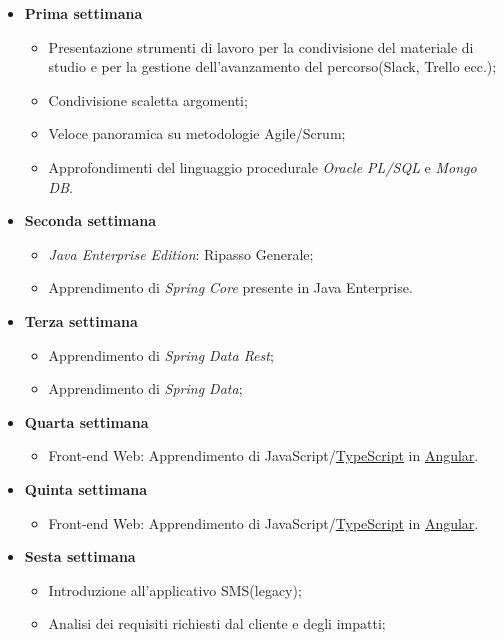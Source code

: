 \begin{itemize}
	\item \textbf{Prima settimana}
		\begin{itemize}
			\item Presentazione strumenti di lavoro per la condivisione del materiale di
			studio e per la gestione dell’avanzamento del percorso(Slack, Trello ecc.);
			\item Condivisione scaletta argomenti;
			\item Veloce panoramica su metodologie Agile/Scrum;
			\item Approfondimenti del linguaggio procedurale \textit{Oracle PL/SQL} e \textit{Mongo
			DB}.
		\end{itemize}
	\item \textbf{Seconda settimana}
		\begin{itemize}
			\item \textit{Java Enterprise Edition}: Ripasso Generale;
			\item Apprendimento di \textit{Spring Core} presente in Java Enterprise.
		\end{itemize}
	\item \textbf{Terza settimana}
		\begin{itemize}
			\item Apprendimento di \textit{Spring Data Rest};
			\item Apprendimento di \textit{Spring Data};
		\end{itemize}	
	\item \textbf{Quarta settimana}\\
		\begin{itemize}
			\item Front-end Web: Apprendimento di \gls{JavaScript}/\hyperref[typescript]{TypeScript} in \hyperref[angular]{Angular}.
		\end{itemize}	
	\item \textbf{Quinta settimana}	
		\begin{itemize}
			\item Front-end Web: Apprendimento di \gls{JavaScript}/\hyperref[typescript]{TypeScript} in \hyperref[angular]{Angular}.
		\end{itemize}
	\item \textbf{Sesta settimana}
		\begin{itemize}
			\item Introduzione all’applicativo SMS(legacy);
			\item Analisi dei requisiti richiesti dal cliente e degli impatti;

\end{itemize}
\end{itemize}

